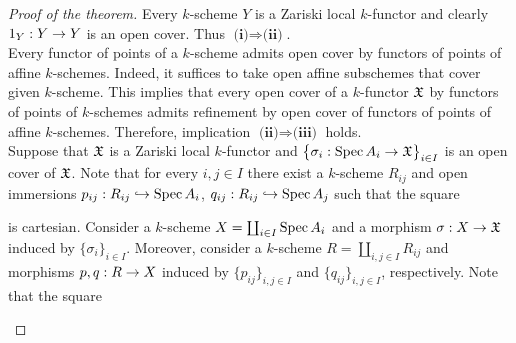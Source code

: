\begin{proof}[Proof of the theorem]
Every $k$-scheme $Y$ is a Zariski local $k$-functor and clearly $1_{Y}:Y \rightarrow Y$ is an open cover. Thus $\textbf{(i)}\Rightarrow \textbf{(ii)}$.\\
Every functor of points of a $k$-scheme admits open cover by functors of points of affine $k$-schemes. Indeed, it suffices to take open affine subschemes that cover given $k$-scheme. This implies that every open cover of a $k$-functor ${\mathfrak X}$ by functors of points of $k$-schemes admits refinement by open cover of functors of points of affine $k$-schemes. Therefore, implication $\textbf{(ii)}\Rightarrow \textbf{(iii)}$ holds.\\
Suppose that ${\mathfrak X}$ is a Zariski local $k$-functor and $\big\{\sigma_i:\mathrm{Spec}\, A_i\rightarrow {\mathfrak X}\big\}_{i\in I}$ is an open cover of ${\mathfrak X}$. Note that for every $i,j\in I$ there exist a $k$-scheme $R_{ij}$ and open immersions $p_{ij}:R_{ij}\hookrightarrow \mathrm{Spec}\, A_i$, $q_{ij}:R_{ij}\hookrightarrow \mathrm{Spec}\, A_j$ such that the square
\begin{center}
\end{center}
is cartesian. Consider a $k$-scheme $X = \coprod_{i\in I}\mathrm{Spec}\, A_i$ and a morphism $\sigma:X \rightarrow {\mathfrak X}$ induced by $\{\sigma_i\}_{i\in I}$. Moreover, consider a $k$-scheme $R = \coprod_{i,j\in I}R_{ij}$ and morphisms $p,q:R\rightarrow X$ induced by $\{p_{ij}\}_{i,j\in I}$ and $\{q_{ij}\}_{i,j\in I}$, respectively. Note that the square
\begin{center}
\end{center}
\end{proof}
